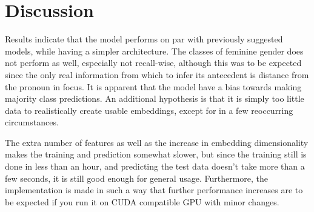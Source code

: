 \documentclass[11pt]{article}
\begin{document}
\begin{table}[t]
    \center
    \caption{Confusion matrix over class predicitons. Row signifies actual class according to gold standard, while column represents predicted class according to the classifier.}
    \label{tbl:confmatrix}
\end{table}

\section{Discussion}

Results indicate that the model performs on par with previously suggested models, while having a simpler architecture.
The classes of feminine gender does not perform as well, especially not recall-wise, although this was to be expected since the only real information from which to infer its antecedent is distance from the pronoun in focus.
It is apparent that the model have a bias towards making majority class predictions.
An additional hypothesis is that it is simply too little data to realistically create usable embeddings, except for in a few reoccurring circumstances.

The extra number of features as well as the increase in embedding dimensionality makes the training and prediction somewhat slower, but since the training still is done in less than an hour, and predicting the test data doesn't take more than a few seconds, it is still good enough for general usage.
Furthermore, the implementation is made in such a way that further performance increases are to be expected if you run it on CUDA compatible GPU with minor changes.
\end{document}
